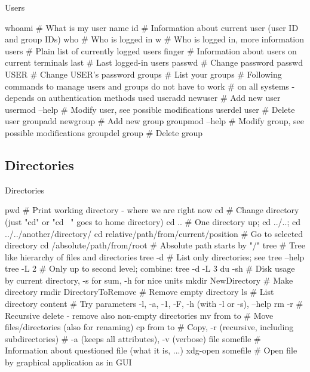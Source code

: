 \documentclass[compress, ucs, xelatex, 11pt, xcolor=svgnames,
  hyperref={
    bookmarks=true,
    unicode=true,
    colorlinks=true,
    pdftitle={Linux, command line and MetaCentrum},
    plainpages=false,
    pdfauthor={Vojtech Zeisek},
    pdfsubject={Course about use of Linux command line, writing shell scripts and using MetaCentrum of CESNET},
    pdfcreator={XeLaTeX},
    pdfkeywords={Linux, GNU, BASH, shell, command line, MetaCentrum},
    linkcolor=Red,
    anchorcolor=Blue,
    citecolor=Purple,
    filecolor=DodgerBlue,
    menucolor=DarkOrchid,
    urlcolor=DeepSkyBlue,
    pdftex},
  url={hyphens, lowtilde} %
  ]{beamer}
\begin{document}
\begin{frame}[fragile]{Users}
  \begin{bashcode}
    whoami # What is my user name
    id # Information about current user (user ID and group IDs)
    who # Who is logged in
    w # Who is logged in, more information
    users # Plain list of currently logged users
    finger # Information about users on current terminals
    last # Last logged-in users
    passwd # Change password
    passwd USER # Change USER's password
    groups # List your groups
    # Following commands to manage users and groups do not have to work
    # on all systems - depends on authentication methods used
    useradd newuser # Add new user
    usermod --help # Modify user, see possible modifications
    userdel user # Delete user
    groupadd newgroup # Add new group
    groupmod --help # Modify group, see possible modifications
    groupdel group # Delete group
  \end{bashcode}
\end{frame}

\subsection{Directories}

\begin{frame}[fragile]{Directories}
  \begin{bashcode}
    pwd # Print working directory - where we are right now
    cd # Change directory (just "cd" or "cd ~" goes to home directory)
    cd .. # One directory up; cd ../..; cd ../../another/directory/
    cd relative/path/from/current/position # Go to selected directory
    cd /absolute/path/from/root # Absolute path starts by "/"
    tree # Tree like hierarchy of files and directories
    tree -d # List only directories; see tree --help
    tree -L 2 # Only up to second level; combine: tree -d -L 3
    du -sh # Disk usage by current directory, -s for sum, -h for nice units
    mkdir NewDirectory # Make directory
    rmdir DirectoryToRemove # Remove empty directory
    ls # List directory content
       # Try parameters -l, -a, -1, -F, -h (with -l or -s), --help
    rm -r # Recursive delete - remove also non-empty directories
    mv from to # Move files/directories (also for renaming)
    cp from to # Copy, -r (recursive, including subdirectories)
               # -a (keeps all attributes), -v (verbose)
    file somefile # Information about questioned file (what it is, ...)
    xdg-open somefile # Open file by graphical application as in GUI
  \end{bashcode}
\end{frame}
\end{document}
